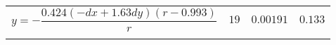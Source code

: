 \documentclass{article}
\begin{document}
\begin{table}[h]
\begin{center}
\begin{tabular}{@{}cccc@{}}
\begin{minipage}{0.8\linewidth} \vspace{-1em} \begin{dmath*} y = - \frac{0.424 \left(- dx + 1.63 dy\right) \left(r - 0.993\right)}{r} \end{dmath*} \end{minipage} & $19$ & $0.00191$ & $0.133$ \\ \\
\bottomrule
\end{tabular}
\end{center}
\end{table}
\end{document}
